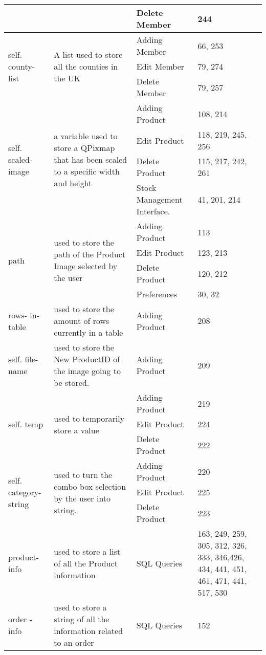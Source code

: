 \begin{center}
\begin{longtable}{|p{1.5cm}|p{4.5cm}|p{1.5cm}|p{3cm}|}
	& & Delete Member & 244 \\ \hline
	\multirow{3}{1.5cm}{self. county-list} & \multirow{3}{4.5cm}{A list used to  store all the counties in the UK} & Adding Member &  66, 253 \\ \cline{3-4}
	& & Edit Member & 79, 274 \\ \cline{3-4}
	& & Delete Member & 79, 257 \\ \hline
	\multirow{4}{1.5cm}{self. scaled-image} & \multirow{4}{4.5cm}{a variable used to store a QPixmap that has been scaled to a specific width and height} & Adding Product &  108, 214 \\ \cline{3-4}
	& & Edit Product & 118, 219, 245, 256 \\ \cline{3-4}
	& & Delete Product & 115, 217, 242, 261 \\ \cline{3-4}
	& & Stock Management Interface. & 41, 201, 214 \\ \hline
	\multirow{4}{1.5cm}{path} & \multirow{4}{4.5cm}{used to store the path of the Product Image selected by the user} & Adding Product & 113 \\ \cline{3-4}
	& & Edit Product & 123, 213 \\ \cline{3-4}
	& & Delete Product & 120, 212  \\ \cline{3-4}
	& & Preferences &  30, 32 \\ \hline
	rows- in-table & used to store the amount of rows currently in a table & Adding Product & 208 \\ \hline
	self. file-name & used to store the New ProductID of the image going to be stored. & Adding Product & 209 \\ \hline
	\multirow{3}{1.5cm}{self. temp} & \multirow{3}{4.5cm}{used to temporarily store a value} & Adding Product &  219 \\ \cline{3-4}
	& & Edit Product & 224 \\ 
	& & Delete Product & 222 \\ \hline
	\multirow{3}{1.5cm}{self. category-string} & \multirow{3}{4.5cm}{used to turn the combo box selection by the user into string.} & Adding Product &  220 \\ \cline{3-4}
	& & Edit Product & 225 \\ \cline{3-4}
	& & Delete Product & 223 \\ \hline
	product-info & used to store a list of all the Product information & SQL Queries & 163, 249, 259, 305, 312, 326, 333, 346,426, 434, 441, 451, 461, 471, 441, 517, 530 \\ \hline
	order -info & used to store a string of all the information related to an order & SQL Queries & 152\\ \hline

\end{longtable}
\end{center}
